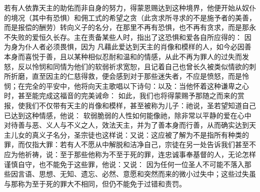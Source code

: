 若有人依靠天主的助佑而非自身的努力，得蒙恩赐达到这种境界，他便开始从奴仆的境况（其中有恐惧）和佣工式的希望之贪（此贪求所寻求的不是施予者的美善，而是报偿的酬劳）转向义子的名分，在那里不再有恐惧，也不再有贪求，而是那永不失败的爱恒久长存。主在责备某些人时，指出了这恐惧和爱各自所应得的： 因为身为仆人者必须畏惧，因为 凡藉此爱达到天主的肖像和模样的人，如今必因善本身而喜悦于善，且以某种相似忍耐和温和的情感，从此不再为罪人的过失而发怒，反以怜悯和同情为他们的软弱祈求宽恕，且记着自己也曾长久被类似情欲的刺所折磨，直至因主的仁慈得救，便会感到对于那些迷失者，不应是愤怒，而是怜悯；在完全的平安中，他将向天主歌唱以下诗句：以及：当他怀着这种谦卑之心时，甚至能完成这福音的完美诫命： 如此，我们也将得蒙赐予那随之而来的赏报，使我们不仅带有天主的肖像和模样，甚至被称为儿子：祂说，圣若望知道自己已达到这种情感，他说： 软弱脆弱的人性如何能像祂，除非常以平静的爱在心中对待善与恶、义人与不义之人，效法天主，并为了善本身而行善，从而确实达到天主儿女的真义子名分，圣宗徒也这样说：又说：这应被了解为不是指所有种类的罪，而仅指大罪：若有人不愿从中解脱和洁净自己，宗徒在另一处告诉我们甚至不应为他祈祷，说：至于那些他称为不至于死的罪，连忠诚事奉基督的人，无论怎样谨慎自守，也不能免于这些罪，他说：又说： 因为任何一位圣人不可能不落入那些因言语、思想、无知、遗忘、必然、意愿和突然而来的微小过失中；这些过失虽与那称为至于死的罪大不相同，但仍不能免于过错和责罚。\par


